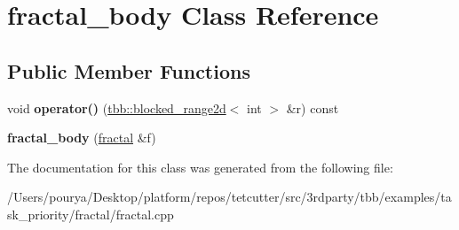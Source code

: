 \hypertarget{classfractal__body}{}\section{fractal\+\_\+body Class Reference}
\label{classfractal__body}
\subsection*{Public Member Functions}
\begin{DoxyCompactItemize}
\item 
\hypertarget{classfractal__body_a77a007b0462f42a5d3f840c0308a7c3f}{}void {\bfseries operator()} (\hyperlink{classtbb_1_1blocked__range2d}{tbb\+::blocked\+\_\+range2d}$<$ int $>$ \&r) const \label{classfractal__body_a77a007b0462f42a5d3f840c0308a7c3f}

\item 
\hypertarget{classfractal__body_a3043a01aed6899b6b9ac44e98a97ae74}{}{\bfseries fractal\+\_\+body} (\hyperlink{classfractal}{fractal} \&f)\label{classfractal__body_a3043a01aed6899b6b9ac44e98a97ae74}

\end{DoxyCompactItemize}


The documentation for this class was generated from the following file\+:\begin{DoxyCompactItemize}
\item 
/\+Users/pourya/\+Desktop/platform/repos/tetcutter/src/3rdparty/tbb/examples/task\+\_\+priority/fractal/fractal.\+cpp\end{DoxyCompactItemize}
